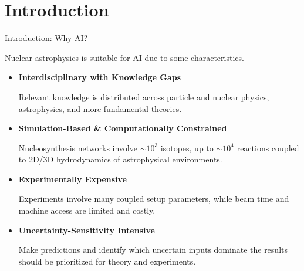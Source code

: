 \section{Introduction}

\setsource{}
\begin{frame}[label=intro-1]{Introduction: Why AI?}
\small

 Nuclear astrophysics is suitable for AI due to some characteristics.

\vspace{0.2cm}

\begin{itemize}
\setlength{\itemsep}{0.6em}

    \item \textbf{Interdisciplinary with Knowledge Gaps}

    Relevant knowledge is distributed across particle and nuclear physics, astrophysics, and more fundamental theories.
    
    \item \textbf{Simulation-Based \& Computationally Constrained}

    Nucleosynthesis networks involve \(\sim10^3\) isotopes, up to \(\sim10^4\) reactions coupled to 2D/3D hydrodynamics of astrophysical environments.
    
    \item \textbf{Experimentally Expensive}

    Experiments involve many coupled setup parameters, while beam time and machine access are limited and costly.
    

    \item \textbf{Uncertainty-Sensitivity Intensive}

    Make predictions and identify which uncertain inputs dominate the results should be prioritized for theory and experiments.
    

\end{itemize}

\end{frame}

%

